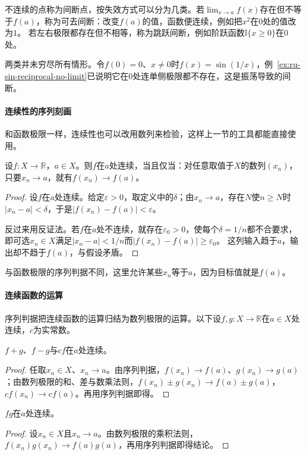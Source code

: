 不连续的点称为间断点，按失效方式可以分为几类。若$\lim_{x\to a}f(x)$存在但不等于$f(a)$，称为可去间断：改变$f(a)$的值，函数便连续，例如把$x^2$在$0$处的值改为$1$。
若左右极限都存在但不相等，称为跳跃间断，例如阶跃函数$\mathbb I\{x\geq0\}$在$0$处。

两类并未穷尽所有情形。令$f(0)=0$、$x\neq0$时$f(x)=\sin(1/x)$，例~\ref{ex:ru-sin-reciprocal-no-limit}已说明它在$0$处连单侧极限都不存在，这是振荡导致的间断。

\paragraph{连续性的序列刻画}
和函数极限一样，连续性也可以改用数列来检验，这样上一节的工具都能直接使用。
\begin{theorem}[连续性的序列判据]
\label{thm:ru-continuity-sequential}
设$f:X\to\mathbb R$，$a\in X$。则$f$在$a$处连续，当且仅当：对任意取值于$X$的数列$(x_n)$，只要$x_n\to a$，就有$f(x_n)\to f(a)$。
\end{theorem}
\begin{proof}
设$f$在$a$处连续。给定$\varepsilon>0$，取定义中的$\delta$；由$x_n\to a$，存在$N$使$n\geq N$时$|x_n-a|<\delta$，于是$|f(x_n)-f(a)|<\varepsilon$。

反过来用反证法。若$f$在$a$处不连续，就存在$\varepsilon_0>0$，使每个$\delta=1/n$都不合要求，即可选$x_n\in X$满足$|x_n-a|<1/n$而$|f(x_n)-f(a)|\geq\varepsilon_0$。
这列输入趋于$a$，输出却不趋于$f(a)$，与假设矛盾。
\end{proof}
与函数极限的序列判据不同，这里允许某些$x_n$等于$a$，因为目标值就是$f(a)$。

\paragraph{连续函数的运算}
序列判据把连续函数的运算归结为数列极限的运算。以下设$f,g:X\to\mathbb R$在$a\in X$处连续，$c$为实常数。

\begin{theorem}[和、差与数乘的连续性]
\label{thm:ru-continuity-linear}
$f+g$、$f-g$与$cf$在$a$处连续。
\end{theorem}
\begin{proof}
任取$x_n\in X$、$x_n\to a$。由序列判据，$f(x_n)\to f(a)$、$g(x_n)\to g(a)$；由数列极限的和、差与数乘法则，$f(x_n)\pm g(x_n)\to f(a)\pm g(a)$，$cf(x_n)\to cf(a)$。再用序列判据即得。
\end{proof}

\begin{theorem}[积的连续性]
\label{thm:ru-continuity-product}
$fg$在$a$处连续。
\end{theorem}
\begin{proof}
设$x_n\in X$且$x_n\to a$。由数列极限的乘积法则，$f(x_n)g(x_n)\to f(a)g(a)$，再用序列判据即得结论。
\end{proof}

